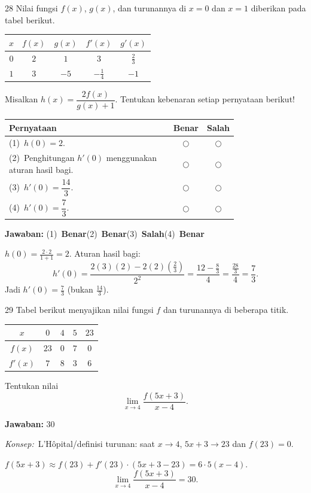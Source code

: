 \documentclass[11pt]{article}
\newcommand{\jawaban}[1]{%
  \noindent\colorbox{gold!30}{\parbox{\dimexpr\linewidth-2\fboxsep\relax}{%
    \textbf{Jawaban:} #1}}\par\smallskip}
\newcommand{\konsep}{\noindent\textit{Konsep:}\ \ignorespaces}
\begin{document}
\begin{soal}{28}
Nilai fungsi $f(x)$, $g(x)$, dan turunannya di $x=0$ dan $x=1$
diberikan pada tabel berikut.
\begin{center}
\begin{tabular}{c|cccc}
$x$ & $f(x)$ & $g(x)$ & $f'(x)$ & $g'(x)$ \\
\hline
$0$ & $2$ & $1$ & $3$ & $\tfrac{2}{3}$ \\
$1$ & $3$ & $-5$ & $-\tfrac{1}{4}$ & $-1$ \\
\end{tabular}
\end{center}
Misalkan $h(x)=\dfrac{2f(x)}{g(x)+1}$.
Tentukan kebenaran setiap pernyataan berikut!

\par\smallskip
{\renewcommand{\arraystretch}{1.4}%
\begin{tabular}{@{}p{0.76\linewidth}cc@{}}
\hline
\textbf{Pernyataan} & \textbf{Benar} & \textbf{Salah}\\
\hline
(1)~$h(0)=2$.
  & $\bigcirc$ & $\bigcirc$\\
(2)~Penghitungan $h'(0)$ menggunakan aturan hasil bagi.
  & $\bigcirc$ & $\bigcirc$\\
(3)~$h'(0)=\dfrac{14}{3}$.
  & $\bigcirc$ & $\bigcirc$\\
(4)~$h'(0)=\dfrac{7}{3}$.
  & $\bigcirc$ & $\bigcirc$\\
\hline
\end{tabular}}
\end{soal}
\begin{pembox}
\jawaban{(1)~\textbf{Benar}\quad(2)~\textbf{Benar}\quad(3)~\textbf{Salah}\quad(4)~\textbf{Benar}}
$h(0)=\tfrac{2\cdot2}{1+1}=2$. Aturan hasil bagi:
\[ h'(0)=\frac{2(3)(2)-2(2)(\tfrac{2}{3})}{2^2}=\frac{12-\tfrac{8}{3}}{4}=\frac{\tfrac{28}{3}}{4}=\frac{7}{3}. \]
Jadi $h'(0)=\tfrac{7}{3}$ (bukan $\tfrac{14}{3}$).
\end{pembox}

\begin{soal}{29}
Tabel berikut menyajikan nilai fungsi $f$ dan turunannya di
beberapa titik.
\begin{center}
\begin{tabular}{c|cccc}
$x$ & $0$ & $4$ & $5$ & $23$ \\
\hline
$f(x)$ & $23$ & $0$ & $7$ & $0$ \\
$f'(x)$ & $7$ & $8$ & $3$ & $6$ \\
\end{tabular}
\end{center}
Tentukan nilai
\[
  \lim_{x\to 4}\frac{f(5x+3)}{x-4}.
\]
\end{soal}
\begin{pembox}
\jawaban{$30$}
\konsep L'Hôpital/definisi turunan: saat $x\to4$, $5x+3\to23$ dan $f(23)=0$.

$f(5x+3)\approx f(23)+f'(23)\cdot(5x+3-23)=6\cdot5(x-4)$.
\[ \lim_{x\to4}\frac{f(5x+3)}{x-4}=30. \]
\end{pembox}
\end{document}
